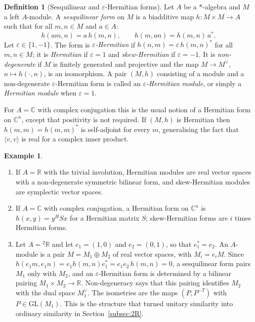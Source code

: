 \documentclass[12pt, a4paper]{report}
\theoremstyle{plain}
\theoremstyle{definition}
\newtheorem{definition}[theorem]{Definition}
\newtheorem{example}[theorem]{Example}
\theoremstyle{remark}
\theoremstyle{plain}
\newcommand{\RR}{\mathbb{R}}
\newcommand{\CC}{\mathbb{C}}
\newcommand{\GL}{\mathrm{GL}}
\newcommand{\twoR}{{}^{2}\mathbb{R}}
\begin{document}
\begin{definition}[Sesquilinear and $\varepsilon$-Hermitian forms]\label{def:hermitian}
Let $A$ be a $*$-algebra and $M$ a left $A$-module. A \emph{sesquilinear form} on $M$ is a biadditive map $h: M \times M \to A$ such that for all $m, n\in M$ and $a\in A$:
\[
 h(am, n) = a\, h(m, n),\qquad h(m, an) = h(m, n)\, a^*.
\]
Let $\varepsilon\in\{1,-1\}$. The form is \emph{$\varepsilon$-Hermitian} if $h(n,m)=\varepsilon\, h(m,n)^*$ for all $m,n\in M$; it is \emph{Hermitian} if $\varepsilon=1$ and \emph{skew-Hermitian} if $\varepsilon=-1$. It is \emph{non-degenerate} if $M$ is finitely generated and projective and the map $M\to M^\vee$, $n\mapsto h(\cdot,n)$, is an isomorphism. A pair $(M,h)$ consisting of a module and a non-degenerate $\varepsilon$-Hermitian form is called an \emph{$\varepsilon$-Hermitian module}, or simply a \emph{Hermitian module} when $\varepsilon=1$.
\end{definition}

For $A=\CC$ with complex conjugation this is the usual notion of a Hermitian form on $\CC^n$, except that positivity is not required. If $(M,h)$ is Hermitian then $h(m,m)=h(m,m)^*$ is self-adjoint for every $m$, generalising the fact that $\langle v,v\rangle$ is real for a complex inner product.

\begin{example}\label{ex:hermitian-modules}
\begin{enumerate}
  \item If $A=\RR$ with the trivial involution, Hermitian modules are real vector spaces with a non-degenerate symmetric bilinear form, and skew-Hermitian modules are symplectic vector spaces.
  \item If $A=\CC$ with complex conjugation, a Hermitian form on $\CC^n$ is $h(x,y)=y^HSx$ for a Hermitian matrix $S$; skew-Hermitian forms are $i$ times Hermitian forms.
  \item Let $A=\twoR$ and let $e_1=(1,0)$ and $e_2=(0,1)$, so that $e_1^*=e_2$. An $A$-module is a pair $M=M_1\oplus M_2$ of real vector spaces, with $M_i=e_iM$. Since $h(e_1m,e_1n)=e_1h(m,n)e_1^*=e_1e_2\,h(m,n)=0$, a sesquilinear form pairs $M_1$ only with $M_2$, and an $\varepsilon$-Hermitian form is determined by a bilinear pairing $M_1\times M_2\to\RR$. Non-degeneracy says that this pairing identifies $M_2$ with the dual space $M_1^{\vee}$. The isometries are the maps $(P,P^{-T})$ with $P\in\GL(M_1)$. This is the structure that turned unitary similarity into ordinary similarity in Section~\ref{subsec:2R}.
\end{enumerate}
\end{example}
\end{document}
